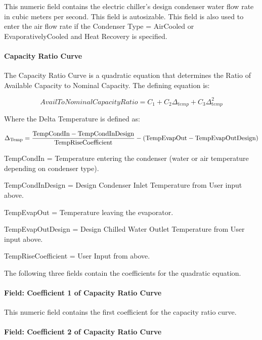 This numeric field contains the electric chiller's design condenser water flow rate in cubic meters per second. This field is autosizable. This field is also used to enter the air flow rate if the Condenser Type = AirCooled or EvaporativelyCooled and Heat Recovery is specified.

\paragraph{Capacity Ratio Curve}\label{capacity-ratio-curve}

The Capacity Ratio Curve is a quadratic equation that determines the Ratio of Available Capacity to Nominal Capacity. The defining equation is:

\begin{equation}
    AvailToNominalCapacityRatio = {C_1} + {C_2}{\Delta_{temp}} + {C_3}\Delta_{temp}^2
\end{equation}

Where the Delta Temperature is defined as:

\begin{equation}
{\Delta_{{\rm{Temp}}}}
    = \frac{{{\rm{TempCondIn  -  TempCondInDesign }}}}{{{\rm{TempRiseCoefficient}}}} - ({\rm{TempEvapOut  -  TempEvapOutDesign)}}
\end{equation}

TempCondIn = Temperature entering the condenser (water or air temperature depending on condenser type).

TempCondInDesign = Design Condenser Inlet Temperature from User input above.

TempEvapOut = Temperature leaving the evaporator.

TempEvapOutDesign = Design Chilled Water Outlet Temperature from User input above.

TempRiseCoefficient = User Input from above.

The following three fields contain the coefficients for the quadratic equation.

\paragraph{Field: Coefficient 1 of Capacity Ratio Curve}\label{field-coefficient-1-of-capacity-ratio-curve}

This numeric field contains the first coefficient for the capacity ratio curve.

\paragraph{Field: Coefficient 2 of Capacity Ratio Curve}\label{field-coefficient-2-of-capacity-ratio-curve}

